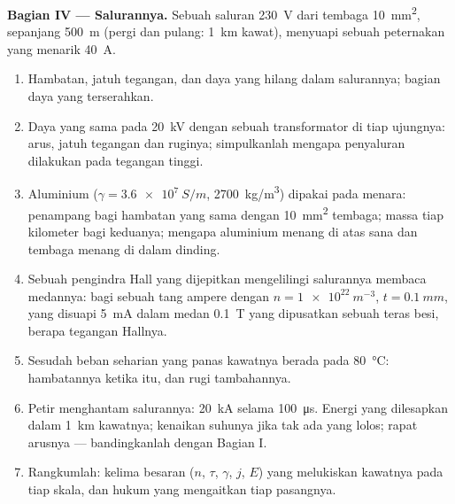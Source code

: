 \begin{problem}
\medskip
\noindent\textbf{Bagian IV --- Salurannya.}
Sebuah saluran \qty{230}{V} dari tembaga \qty{10}{mm^2}, sepanjang \qty{500}{m} (pergi dan pulang:
\qty{1}{km} kawat), menyuapi sebuah peternakan yang menarik \qty{40}{A}.
\begin{enumerate}[resume]
  \item Hambatan, jatuh tegangan, dan daya yang hilang dalam salurannya; bagian
        daya yang terserahkan.
  \item Daya yang sama pada \qty{20}{kV} dengan sebuah transformator di tiap ujungnya:
        arus, jatuh tegangan dan ruginya; simpulkanlah mengapa penyaluran dilakukan pada
        tegangan tinggi.
  \item Aluminium ($\gamma = \qty{3.6e7}{S/m}$, \qty{2700}{kg/m^3}) dipakai pada
        menara: penampang bagi hambatan yang sama dengan \qty{10}{mm^2}
        tembaga; massa tiap kilometer bagi keduanya; mengapa aluminium menang di
        atas sana dan tembaga menang di dalam dinding.
  \item Sebuah pengindra Hall yang dijepitkan mengelilingi salurannya membaca medannya: bagi
        sebuah tang ampere dengan $n = \qty{1e22}{m^{-3}}$, $t = \qty{0.1}{mm}$, yang disuapi
        \qty{5}{mA} dalam medan \qty{0.1}{T} yang dipusatkan sebuah teras besi,
        berapa tegangan Hallnya.
  \item Sesudah beban seharian yang panas kawatnya berada pada \qty{80}{\degreeCelsius}:
        hambatannya ketika itu, dan rugi tambahannya.
  \item Petir menghantam salurannya: \qty{20}{kA} selama \qty{100}{\micro s}. Energi
        yang dilesapkan dalam \qty{1}{km} kawatnya; kenaikan suhunya jika tak ada yang
        lolos; rapat arusnya --- bandingkanlah dengan Bagian I.
  \item Rangkumlah: kelima besaran ($n$, $\tau$, $\gamma$, $j$, $E$) yang
        melukiskan kawatnya pada tiap skala, dan hukum yang mengaitkan tiap
        pasangnya.
\end{enumerate}
\end{problem}

